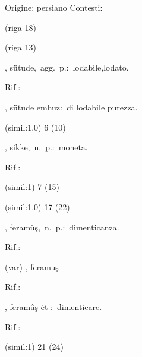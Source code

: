 \begin{glossario}{Origine: persiano}
Contesti:
\begin{subvocedue}
\item[(riga 18)] 
\item[(riga 13)] 
\end{subvocedue}
\item[{\color{colorlowref}\spzrl{sutUd.T}},] {\sf sütude},\ agg.\ p.:\ lodabile,lodato.
\begin{subvocedue}
\item[Rif.:] 
\end{subvocedue}
\begin{subvocedue}
\item[\subglossariobullet] , {\sf sütude emhuz}:\ di lodabile purezza.
\item[(simil:1.0)]   6 (10)
\end{subvocedue}
\item[{\color{colorlowref}\spzrl{sikk.H}},] {\sf sikke},\ n.\ p.:\ moneta.
\begin{subvocedue}
\item[Rif.:] 
\end{subvocedue}
\begin{subvocedue}
\item[(simil:1)]   7 (15)
\item[(simil:1.0)]   17 (22)
\end{subvocedue}
\item[{\color{colorlowref}\spzrl{firAmU^s}},] {\sf feramûş},\ n.\ p.:\ dimenticanza.
\begin{subvocedue}
\item[Rif.:] 
\end{subvocedue}
\begin{subvocedue}
\item[(var)] , {\sf feramuş}\begin{subvocedue}
\item[Rif.:] 
\end{subvocedue}
\item[\subglossariobullet] , {\sf feramûş ėt-}:\ dimenticare.
\begin{subvocedue}
\item[Rif.:] 
\end{subvocedue}
\item[(simil:1)]   21 (24)

\end{subvocedue}
\end{glossario}
